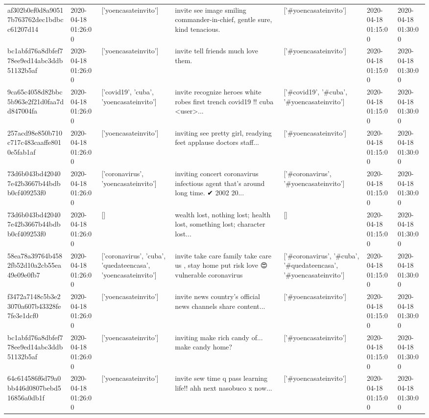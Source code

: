 \begin{tabular}{lllllll}
af302b0ef0d8a90517b763762dec1bdbcc61207d14 & 2020-04-18 01:26:00 & ['yoencasateinvito'] & invite see image smiling commander-in-chief, gentle sure, kind tenacious. & ['#yoencasateinvito'] & 2020-04-18 01:15:00 & 2020-04-18 01:30:00 \\
bc1abfd76a8dbfef778ee9ed14abc3ddb51132b5af & 2020-04-18 01:26:00 & ['yoencasateinvito'] & invite tell friends much love them. & ['#yoencasateinvito'] & 2020-04-18 01:15:00 & 2020-04-18 01:30:00 \\
9ca65c4058d82bbc5b963e2f21d0faa7dd847004fa & 2020-04-18 01:26:00 & ['covid19', 'cuba', 'yoencasateinvito'] & invite recognize heroes white robes first trench covid19 !!️ cuba <user>... & ['#covid19', '#cuba', '#yoencasateinvito'] & 2020-04-18 01:15:00 & 2020-04-18 01:30:00 \\
257acd98e850b710c717c483caaffe8010e5fab1af & 2020-04-18 01:26:00 & ['yoencasateinvito'] & inviting see pretty girl, readying feet applause doctors staff... & ['#yoencasateinvito'] & 2020-04-18 01:15:00 & 2020-04-18 01:30:00 \\
73d6b043bd420407e42b3667b44bdbb0cf409253f0 & 2020-04-18 01:26:00 & ['coronavirus', 'yoencasateinvito'] & inviting concert coronavirus infectious agent that's around long time. ✔ 2002 20... & ['#coronavirus', '#yoencasateinvito'] & 2020-04-18 01:15:00 & 2020-04-18 01:30:00 \\
73d6b043bd420407e42b3667b44bdbb0cf409253f0 & 2020-04-18 01:26:00 & [] & wealth lost, nothing lost; health lost, something lost; character lost... & [] & 2020-04-18 01:15:00 & 2020-04-18 01:30:00 \\
58ea78a39764b4582fb52d10a2cb55ea49e09e0fb7 & 2020-04-18 01:26:00 & ['coronavirus', 'cuba', 'quedateencasa', 'yoencasateinvito'] & invite take care family take care us , stay home put risk love 😍 vulnerable coronavirus & ['#coronavirus', '#cuba', '#quedateencasa', '#yoencasateinvito'] & 2020-04-18 01:15:00 & 2020-04-18 01:30:00 \\
f3472a7148c5b3e23070a607b43328fe7fe3e1dcf0 & 2020-04-18 01:26:00 & ['yoencasateinvito'] & invite news country's official news channels share content... & ['#yoencasateinvito'] & 2020-04-18 01:15:00 & 2020-04-18 01:30:00 \\
bc1abfd76a8dbfef778ee9ed14abc3ddb51132b5af & 2020-04-18 01:26:00 & ['yoencasateinvito'] & inviting make rich candy of... make candy home? & ['#yoencasateinvito'] & 2020-04-18 01:15:00 & 2020-04-18 01:30:00 \\
64c614586f6d79a0bb446d0807bebd516856a0db1f & 2020-04-18 01:26:00 & ['yoencasateinvito'] & invite sew time q pass learning life!! ahh next nasobuco x now... & ['#yoencasateinvito'] & 2020-04-18 01:15:00 & 2020-04-18 01:30:00 \\

\end{tabular}
